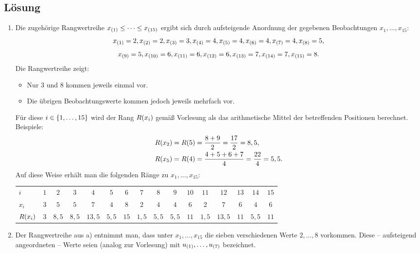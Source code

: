 \documentclass{exercise}
\begin{document}
    \subsection*{Lösung}
    \begin{enumerate}
        \item Die zugehörige Rangwertreihe \(x_{\parentheses*{1}} \le \cdots \le x_{\parentheses*{15}}\) ergibt sich durch aufsteigende Anordnung der gegebenen Beobachtungen \(x_1, \ldots, x_15\):
        \[
            x_{\parentheses*{1}} = 2, x_{\parentheses*{2}} = 2, x_{\parentheses*{3}} = 3, x_{\parentheses*{4}} = 4, x_{\parentheses*{5}} = 4, x_{\parentheses*{6}} = 4, x_{\parentheses*{7}} = 4, x_{\parentheses*{8}} = 5,
        \]
        \[
            x_{\parentheses*{9}} = 5, x_{\parentheses*{10}} = 6, x_{\parentheses*{11}} = 6, x_{\parentheses*{12}} = 6, x_{\parentheses*{13}} = 7, x_{\parentheses*{14}} = 7, x_{\parentheses*{15}} = 8.
        \]
        Die Rangwertreihe zeigt:
        \begin{itemize}
            \item Nur \(3\) und \(8\) kommen jeweils einmal vor.
            \item Die übrigen Beobachtungswerte kommen jedoch jeweils mehrfach vor. 
        \end{itemize}
        Für diese \(i \in \braces*{1, \ldots, 15}\) wird der Rang \(R\parentheses*{x_i}\) gemäß Vorlesung als das arithmetische Mittel der betreffenden Positionen berechnet.
        Beispiele:
        \begin{align*}
            R\parentheses*{x_2} &= R\parentheses*{5} = \frac{8 + 9}{2} = \frac{17}{2} = 8,5,\\
            R\parentheses*{x_5} &= R\parentheses*{4} = \frac{4 + 5 + 6 + 7}{4} = \frac{22}{4} = 5,5.
        \end{align*}
        Auf diese Weise erhält man die folgenden Ränge zu \(x_1, \ldots, x_{15}\):
        \begin{center}
            \begin{tabular}{lccccccccccccccc}
                \toprule
                \(i\) & \(1\) & \(2\) & \(3\) & \(4\) & \(5\) & \(6\) & \(7\) & \(8\) & \(9\) & \(10\) & \(11\) & \(12\) & \(13\) & \(14\) & \(15\)\\
                \(x_i\) & \(3\) & \(5\) & \(5\) & \(7\) & \(4\) & \(8\) & \(2\) & \(4\) & \(4\) & \(6\) & \(2\) & \(7\) & \(6\) & \(4\) & \(6\)\\
                \midrule
                \(R\parentheses*{x_i}\) & \(3\) & \(8,5\) & \(8,5\) & \(13,5\) & \(5,5\) & \(15\) & \(1,5\) & \(5,5\) & \(5,5\) & \(11\) & \(1,5\) & \(13,5\) & \(11\) & \(5,5\) & \(11\)\\
                \bottomrule
            \end{tabular}
        \end{center}
        \item Der Rangwertreihe aus a) entnimmt man, dass unter \(x_1, \ldots, x_{15}\) die sieben verschiedenen Werte \(2, \ldots, 8\) vorkommen.
        Diese -- aufsteigend angeordneten -- Werte seien (analog zur Vorlesung) mit \(u_{\parentheses*{1}}, \ldots, u_{\parentheses*{7}}\) bezeichnet.


\end{enumerate}
\end{document}
